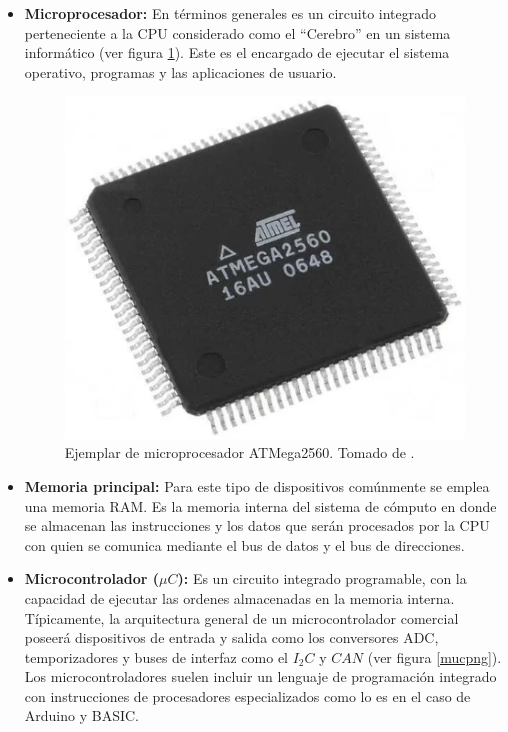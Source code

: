 \begin{itemize}
    \item \textbf{Microprocesador:} En términos generales es un circuito integrado perteneciente a la CPU considerado como el ``Cerebro'' en un sistema informático (ver figura \ref{atmegapng}). Este es el encargado de ejecutar el sistema operativo, programas y las aplicaciones de usuario.
    
\begin{figure}[H]
 \begin{center}
 \includegraphics[scale=0.65]{img/atmega.png}
 \end{center}
 \caption{Ejemplar de microprocesador ATMega2560. Tomado de \cite{arduinodef}.
 \label{atmegapng}}
\end{figure}

    \item \textbf{Memoria principal:} Para este tipo de dispositivos comúnmente se emplea una memoria RAM. Es la memoria interna del sistema de cómputo en donde se almacenan las instrucciones y los datos que serán procesados por la CPU con quien se comunica mediante el bus de datos y el bus de direcciones.
    
    \item \textbf{Microcontrolador ($\mu C$):} Es un circuito integrado programable, con la capacidad de ejecutar las ordenes almacenadas en la memoria interna. Típicamente, la arquitectura general de un microcontrolador comercial poseerá dispositivos de entrada y salida como los conversores ADC, temporizadores y buses de interfaz como el $I_2C$ y $CAN$ (ver figura \ref{mucpng}). Los microcontroladores suelen incluir un lenguaje de programación integrado con instrucciones de procesadores especializados como lo es en el caso de Arduino y BASIC.
    

\end{itemize}

